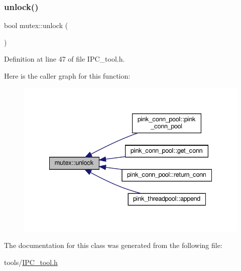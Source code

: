 \subsubsection{\texorpdfstring{unlock()}{unlock()}}
{\footnotesize\ttfamily bool mutex\+::unlock (\begin{DoxyParamCaption}{ }\end{DoxyParamCaption})\hspace{0.3cm}{\ttfamily [inline]}}



Definition at line 47 of file I\+P\+C\+\_\+tool.\+h.

Here is the caller graph for this function\+:
\nopagebreak
\begin{figure}[H]
\begin{center}
\leavevmode
\includegraphics[width=335pt]{classmutex_a47bc4d60f08056af411b57e321959fe1_icgraph}
\end{center}
\end{figure}


The documentation for this class was generated from the following file\+:\begin{DoxyCompactItemize}
\item 
tools/\hyperlink{_i_p_c__tool_8h}{I\+P\+C\+\_\+tool.\+h}\end{DoxyCompactItemize}
